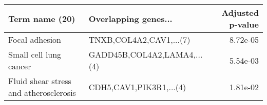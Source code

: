 \begin{tabular}{llr}
\toprule
                        Term name (20) &        Overlapping genes... &  Adjusted p-value \\
\midrule
                        Focal adhesion &     TNXB,COL4A2,CAV1,...(7) &          8.72e-05 \\
                Small cell lung cancer & GADD45B,COL4A2,LAMA4,...(4) &          5.54e-03 \\
Fluid shear stress and atherosclerosis &     CDH5,CAV1,PIK3R1,...(4) &          1.81e-02 \\
\bottomrule
\end{tabular}
